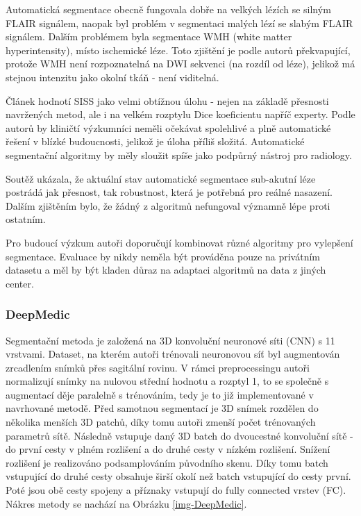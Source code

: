 \documentclass[11pt]{article}
\begin{document}
Automatická segmentace obecně fungovala dobře na velkých lézích se silným FLAIR signálem, naopak byl problém v segmentaci malých lézí se slabým FLAIR signálem. Dalším problémem byla segmentace WMH (\alert{white matter hyperintensity}), místo ischemické léze. Toto zjištění je podle autorů překvapující, protože WMH není rozpoznatelná na DWI sekvenci (na rozdíl od léze), jelikož má stejnou intenzitu jako okolní tkáň - není viditelná.

Článek hodnotí SISS jako velmi obtížnou úlohu - nejen na základě přesnosti navržených metod, ale i na velkém rozptylu Dice koeficientu napříč experty. Podle autorů by kliničtí výzkumníci neměli očekávat spolehlivé a plně automatické řešení v blízké budoucnosti, jelikož je úloha příliš složitá. Automatické segmentační algoritmy by měly sloužit spíše jako podpůrný nástroj pro radiology.

Soutěž ukázala, že aktuální stav automatické segmentace sub-akutní léze postrádá jak přesnost, tak robustnost, která je potřebná pro reálné nasazení. Dalším zjištěním bylo, že žádný z algoritmů nefungoval významně lépe proti ostatním.

Pro budoucí výzkum autoři doporučují kombinovat různé algoritmy pro vylepšení segmentace. Evaluace by nikdy neměla být prováděna pouze na privátním datasetu a měl by být kladen důraz na adaptaci algoritmů na data z jiných center.

\subsubsection{DeepMedic \cite{uk-imp2}}
\label{lbl-DeepMedic}
Segmentační metoda je založená na 3D konvoluční neuronové síti (CNN) s 11 vrstvami. Dataset, na kterém autoři trénovali neuronovou síť byl augmentován zrcadlením snímků přes sagitální rovinu. V rámci preprocessingu autoři normalizují snímky na nulovou střední hodnotu a rozptyl 1, to se společně s augmentací děje paralelně s trénováním, tedy je to již implementované v navrhované metodě. Před samotnou segmentací je 3D snímek rozdělen do několika menších 3D patchů, díky tomu autoři zmenší počet trénovaných parametrů sítě. Následně vstupuje daný 3D batch do dvoucestné konvoluční sítě - do první cesty v plném rozlišení a do druhé cesty v nízkém rozlišení. Snížení rozlišení je realizováno podsamplováním původního skenu. Díky tomu batch vstupující do druhé cesty obsahuje širší okolí než batch vstupující do cesty první. Poté jsou obě cesty spojeny a příznaky vstupují do fully connected vrstev (FC). Nákres metody se nachází na Obrázku \ref{img-DeepMedic}.
\end{document}
